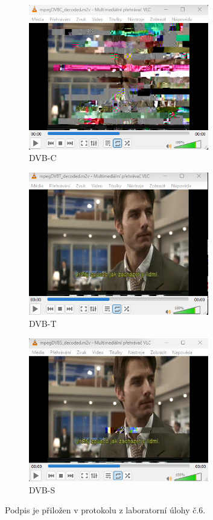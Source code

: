 \documentclass[10pt, a4paper]{article}%
\begin{document}
\begin{figure}[ht!]
    \centering
    \includegraphics[width=0.7\textwidth]{DVBC.png}
    \caption{DVB-C}    
\end{figure}
\clearpage
\begin{figure}[ht!]
    \centering
    \includegraphics[width=0.7\textwidth]{DVBT.png}
    \caption{DVB-T}    
\end{figure}

\begin{figure}[ht!]
    \centering
    \includegraphics[width=0.7\textwidth]{DVBS.png}
    \caption{DVB-S}    
\end{figure}

Podpis je přiložen v protokolu z laboratorní úlohy č.6.
\end{document}
